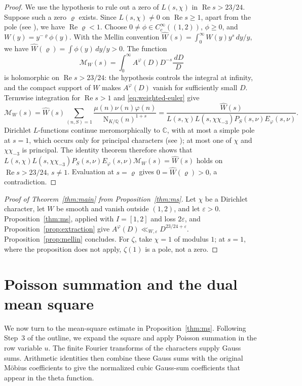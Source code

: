 \documentclass[11pt,a4paper]{article}
\numberwithin{equation}{section}
\numberwithin{figure}{section}
\theoremstyle{definition}
\theoremstyle{remark}
\newcommand{\Q}{\mathbb Q}
\newcommand{\NK}{\mathrm N_{K/\Q}}
\newcommand{\C}{\mathbb C}
\newcommand{\Rea}{\operatorname{Re}}
\newcommand{\dd}{\,d}
\begin{document}
\begin{proof}
We use the hypothesis to rule out a zero of $L(s,\chi)$ in
$\Rea s>23/24$. Suppose such a zero $\varrho$ exists. Since $L(s,\chi)\ne0$ on $\Rea s\ge1$,
apart from the pole (see \cite[Chapters~13 and~14]{Dav00}), we have $\Rea\varrho<1$.
Choose $0\ne\phi\in C_c^\infty((1,2))$, $\phi\ge0$, and
$W(y)=y^{-\varrho}\phi(y)$.
With the Mellin convention
$\widehat W(s)=\int_0^\infty W(y)y^s\dd y/y$, we have
$\widehat W(\varrho)=\int\phi(y)\dd y/y>0$.
The function
\[
 \mathcal M_W(s)=\int_0^\infty A^\varphi(D)D^{-s}\frac{\dd D}{D}
\]
is holomorphic on $\Rea s>23/24$: the hypothesis
controls the integral at infinity, and
the compact support of $W$ makes $A^\varphi(D)$ vanish for sufficiently
small $D$. Termwise integration for $\Rea s>1$ and \eqref{eq:weighted-euler} give
\[
 \mathcal M_W(s)
 =\widehat W(s)\sum_{(n,S)=1}\frac{\mu(n)\nu(n)\varphi(n)}{\NK(n)^{1+s}}
 =\frac{\widehat W(s)}{L(s,\chi)L(s,\chi\chi_{-3})P_S(s,\nu)E_\varphi(s,\nu)}.
\]
Dirichlet $L$-functions continue meromorphically to $\C$, with at most a simple pole at $s=1$,
which occurs only for principal characters (see \cite[Chapters~8 and~9]{Dav00}); at most one of
$\chi$ and $\chi\chi_{-3}$ is principal. The identity theorem therefore shows that
$L(s,\chi)L(s,\chi\chi_{-3})P_S(s,\nu)E_\varphi(s,\nu)\mathcal M_W(s)=\widehat W(s)$ holds on
$\Rea s>23/24$, $s\ne1$.
Evaluation at $s=\varrho$ gives $0=\widehat W(\varrho)>0$, a contradiction.
\end{proof}

\begin{proof}[Proof of Theorem~\ref{thm:main} from Proposition~\ref{thm:ms}]
Let $\chi$ be a Dirichlet character, let $W$ be smooth and vanish outside $(1,2)$, and let
$\varepsilon>0$. Proposition~\ref{thm:ms}, applied with $I=[1,2]$ and loss $2\varepsilon$, and
Proposition~\ref{prop:extraction} give $A^\varphi(D)\ll_{W,\varepsilon}D^{23/24+\varepsilon}$.
Proposition~\ref{prop:mellin} concludes. For $\zeta$, take $\chi=1$ of modulus $1$; at $s=1$,
where the proposition does not apply, $\zeta(1)$ is a pole, not a zero.
\end{proof}

\section{Poisson summation and the dual mean square}\label{sec:initialization}

We now turn to the mean-square estimate in Proposition~\ref{thm:ms}.
Following Step~3 of the outline, we expand the square and apply
Poisson summation in the row variable $u$. The finite Fourier
transforms of the characters supply Gauss sums. Arithmetic identities
then combine these Gauss sums with the original M\"obius coefficients
to give the normalized cubic Gauss-sum coefficients that appear in the theta
function.
\end{document}
